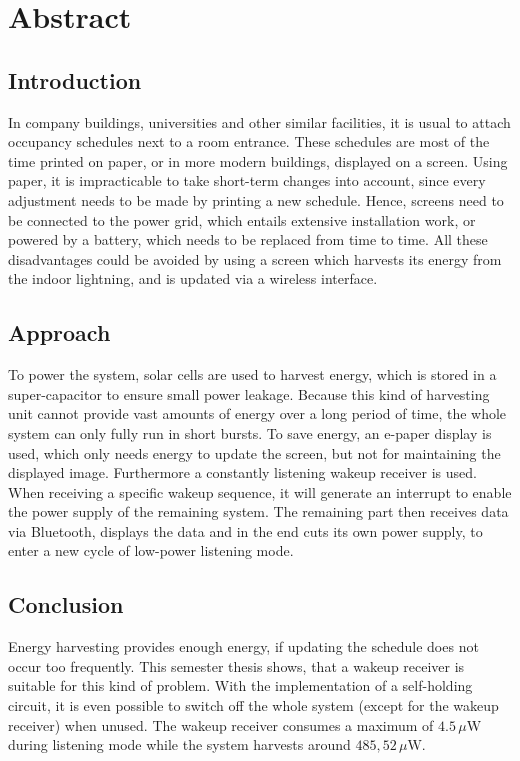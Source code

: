 \chapter*{Abstract}

\section*{Introduction}
In company buildings, universities and other similar facilities, it is usual to attach occupancy schedules next to a room entrance. These schedules are most of the time printed on paper, or in more modern buildings, displayed on a screen. Using paper, it is impracticable to take short-term changes into account, since every adjustment needs to be made by printing a new schedule. Hence, screens need to be connected to the power grid, which entails extensive installation work, or powered by a battery, which needs to be replaced from time to time. All these disadvantages could be avoided by using a screen which harvests its energy from the indoor lightning, and is updated via a wireless interface.

\section*{Approach}
To power the system, solar cells are used to harvest energy, which is stored in a super-capacitor to ensure small power leakage. Because this kind of harvesting unit cannot provide vast amounts of energy over a long period of time, the whole system can only fully run in short bursts. To save energy, an e-paper display is used, which only needs energy to update the screen, but not for maintaining the displayed image. Furthermore a constantly listening wakeup receiver is used. When receiving a specific wakeup sequence, it will generate an interrupt to enable the power supply of the remaining system. The remaining part then receives data via Bluetooth, displays the data and in the end cuts its own power supply, to enter a new cycle of low-power listening mode. 

\section*{Conclusion}
Energy harvesting provides enough energy, if updating the schedule does not occur too frequently. This semester thesis shows, that a wakeup receiver is suitable for this kind of problem. With the implementation of a self-holding circuit, it is even possible to switch off the whole system (except for the wakeup receiver) when unused. The wakeup receiver consumes a maximum of $4.5\,\mu \text{W}$ during listening mode while the system harvests around $485,52\,\mu\text{W}$.  